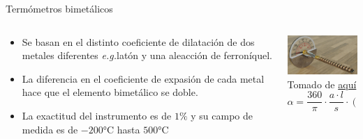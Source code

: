 \documentclass[aspectratio=169]{beamer}
\begin{document}
\begin{frame}{Termómetros bimetálicos}
    \begin{columns}[c, onlytextwidth]
        \begin{column}{0.5\textwidth}
            \begin{itemize}
                \item Se basan en el distinto coeficiente de dilatación de dos metales diferentes \textit{e.g.}latón y una aleacción de ferroníquel. 
                \item La diferencia en el coeficiente de expasión de cada metal hace que el elemento bimetálico se doble. 
                \item La exactitud del instrumento es de $1\%$ y su campo de medida es de $-200\si{\celsius}$ hasta $500\si{\celsius}$
            \end{itemize}
        \end{column}
        \begin{column}{0.45\textwidth}
            \centering
            \includegraphics[width=5cm]{fig/bimetalic.png}
             \\ \tiny{Tomado de \href{https://natstuk.com/?p=786}{aquí}}
        \begin{equation*}
                \alpha = \dfrac{360}{\pi}\cdot \dfrac{a \cdot l}{s}\cdot (t_2-t_1) 
        \end{equation*}
        \end{column}
    \end{columns}
\end{frame}
\end{document}
